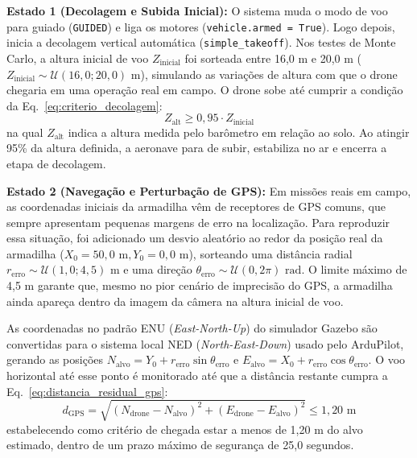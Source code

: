 \textbf{Estado 1 (Decolagem e Subida Inicial):} O sistema muda o modo de voo para guiado (\texttt{GUIDED}) e liga os motores (\texttt{vehicle.armed = True}). Logo depois, inicia a decolagem vertical automática (\texttt{simple\_takeoff}). Nos testes de Monte Carlo, a altura inicial de voo $Z_{\text{inicial}}$ foi sorteada entre 16,0 m e 20,0 m ($Z_{\text{inicial}} \sim \mathcal{U}(16{,}0; 20{,}0)\text{ m}$), simulando as variações de altura com que o drone chegaria em uma operação real em campo. O drone sobe até cumprir a condição da Eq.~\ref{eq:criterio_decolagem}:
\begin{equation}
	Z_{\text{alt}} \ge 0{,}95 \cdot Z_{\text{inicial}}
	\label{eq:criterio_decolagem}
\end{equation}
na qual $Z_{\text{alt}}$ indica a altura medida pelo barômetro em relação ao solo. Ao atingir 95\% da altura definida, a aeronave para de subir, estabiliza no ar e encerra a etapa de decolagem.

\textbf{Estado 2 (Navegação e Perturbação de GPS):} Em missões reais em campo, as coordenadas iniciais da armadilha vêm de receptores de GPS comuns, que sempre apresentam pequenas margens de erro na localização. Para reproduzir essa situação, foi adicionado um desvio aleatório ao redor da posição real da armadilha ($X_0 = 50{,}0\text{ m}, Y_0 = 0{,}0\text{ m}$), sorteando uma distância radial $r_{\text{erro}} \sim \mathcal{U}(1{,}0; 4{,}5)\text{ m}$ e uma direção $\theta_{\text{erro}} \sim \mathcal{U}(0, 2\pi)\text{ rad}$. O limite máximo de 4,5 m garante que, mesmo no pior cenário de imprecisão do GPS, a armadilha ainda apareça dentro da imagem da câmera na altura inicial de voo.

As coordenadas no padrão ENU (\textit{East-North-Up}) do simulador Gazebo são convertidas para o sistema local NED (\textit{North-East-Down}) usado pelo ArduPilot, gerando as posições $N_{\text{alvo}} = Y_0 + r_{\text{erro}} \sin\theta_{\text{erro}}$ e $E_{\text{alvo}} = X_0 + r_{\text{erro}} \cos\theta_{\text{erro}}$. O voo horizontal até esse ponto é monitorado até que a distância restante cumpra a Eq.~\ref{eq:distancia_residual_gps}:
\begin{equation}
	d_{\text{GPS}} = \sqrt{(N_{\text{drone}} - N_{\text{alvo}})^2 + (E_{\text{drone}} - E_{\text{alvo}})^2} \le 1{,}20\text{ m}
	\label{eq:distancia_residual_gps}
\end{equation}
estabelecendo como critério de chegada estar a menos de 1,20 m do alvo estimado, dentro de um prazo máximo de segurança de 25,0 segundos.

